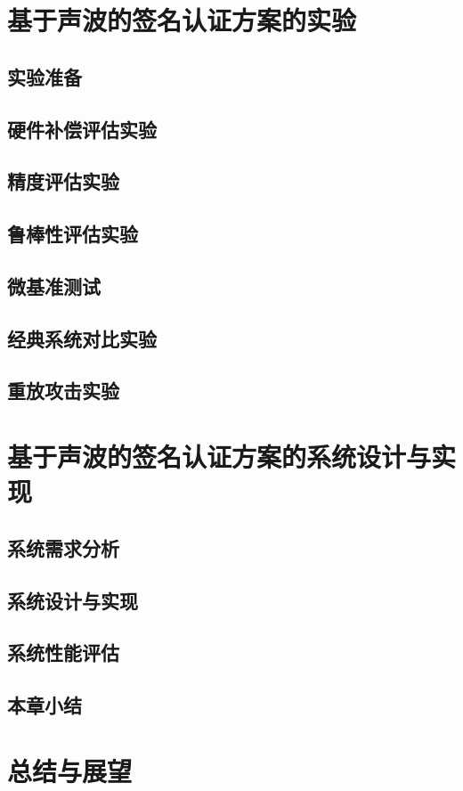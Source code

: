 \chapter{基于声波的签名认证方案的实验}
\section{实验准备}
\section{硬件补偿评估实验}
\section{精度评估实验}
\section{鲁棒性评估实验}
\section{微基准测试}
\section{经典系统对比实验}
\section{重放攻击实验}


\chapter{基于声波的签名认证方案的系统设计与实现}
\section{系统需求分析}
\section{系统设计与实现}
\section{系统性能评估}
\section{本章小结}


\chapter{总结与展望}
